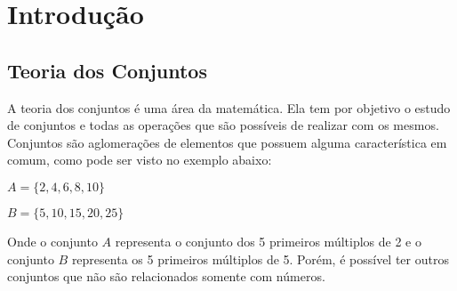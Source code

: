 \chapter{\label{chap:intro}Introdução}
%
%
%
%
%
%
%
%
\section{Teoria dos Conjuntos}

A teoria dos conjuntos é uma área da matemática. Ela tem por objetivo o estudo de conjuntos e todas as operações que são possíveis de realizar com os mesmos. Conjuntos são aglomerações de elementos que possuem alguma característica em comum, como pode ser visto no exemplo abaixo:\\

\begin{exmp}
$A = \{2, 4, 6, 8, 10\}$\par
$B = \{5, 10, 15, 20, 25\}$\\
\end{exmp}
Onde o conjunto $A$ representa o conjunto dos 5 primeiros múltiplos de 2 e o conjunto $B$ representa os 5 primeiros múltiplos de 5. Porém, é possível ter outros conjuntos que não são relacionados somente com números. 

